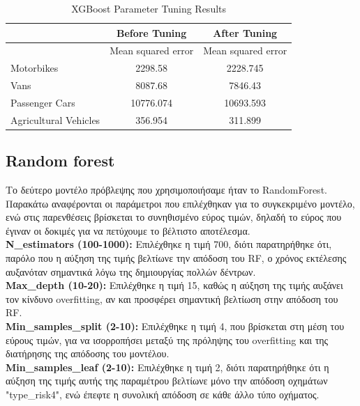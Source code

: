 \documentclass{llncs}
\begin{document}
\begin{table}[h!]
    \centering
    \begin{tabular}{lcc}
        \hline
        & \multicolumn{1}{c}{Before Tuning} & \multicolumn{1}{c}{After Tuning} \\
        \hline
        & Mean squared error & Mean squared error \\
        \hline
        Motorbikes & 2298.58 & 2228.745  \\
        Vans & 8087.68 & 7846.43 \\
        Passenger Cars & 10776.074  & 10693.593 \\
        Agricultural Vehicles & 356.954 & 311.899\\
        \hline
    \end{tabular}
    \caption{XGBoost Parameter Tuning Results}
\end{table}

\subsection{Random forest}
Το δεύτερο μοντέλο πρόβλεψης που χρησιμοποιήσαμε ήταν το RandomForest. Παρακάτω αναφέρονται οι παράμετροι που επιλέχθηκαν για το συγκεκριμένο μοντέλο, ενώ στις παρενθέσεις βρίσκεται το συνηθισμένο εύρος τιμών, δηλαδή το εύρος που έγιναν οι δοκιμές για να πετύχουμε το βέλτιστο αποτέλεσμα.\\


\noindent \textbf{N\_estimators (100-1000):}
Επιλέχθηκε η τιμή 700, διότι παρατηρήθηκε ότι, παρόλο που η αύξηση της τιμής βελτίωνε την απόδοση του RF, ο χρόνος εκτέλεσης αυξανόταν σημαντικά λόγω της δημιουργίας πολλών δέντρων.\\

\noindent \textbf{Max\_depth (10-20):}
Επιλέχθηκε η τιμή 15, καθώς η αύξηση της τιμής αυξάνει τον κίνδυνο overfitting, αν και προσφέρει σημαντική βελτίωση στην απόδοση του RF. \\

\noindent \textbf{Min\_samples\_split (2-10):}
Επιλέχθηκε η τιμή 4, που βρίσκεται στη μέση του εύρους τιμών, για να ισορροπήσει μεταξύ της πρόληψης του overfitting και της διατήρησης της απόδοσης του μοντέλου.\\

\noindent \textbf{Min\_samples\_leaf (2-10):}
Επιλέχθηκε η τιμή 2, διότι παρατηρήθηκε ότι η αύξηση της τιμής αυτής της παραμέτρου βελτίωνε μόνο την απόδοση οχημάτων "type\_risk4", ενώ έπεφτε η συνολική απόδοση σε κάθε άλλο τύπο οχήματος. \\
\end{document}
